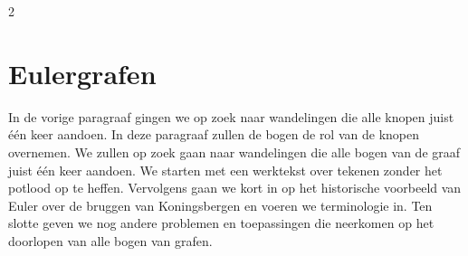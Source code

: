 \eindewerktekst
\newpage

\begin{multicols}{2}


\section{Eulergrafen}


In de vorige paragraaf gingen we op zoek naar wandelingen die alle knopen juist één keer aandoen. In deze paragraaf zullen de bogen de rol van de knopen overnemen. We zullen op zoek gaan naar wandelingen die alle bogen van de graaf juist één keer aandoen. We starten met een werktekst over tekenen zonder het potlood op te heffen. Vervolgens gaan we kort in op het historische voorbeeld van Euler over de bruggen van Koningsbergen en voeren we terminologie in. Ten slotte geven we nog andere problemen en toepassingen die neerkomen op het doorlopen van alle bogen van grafen.

\end{multicols}



